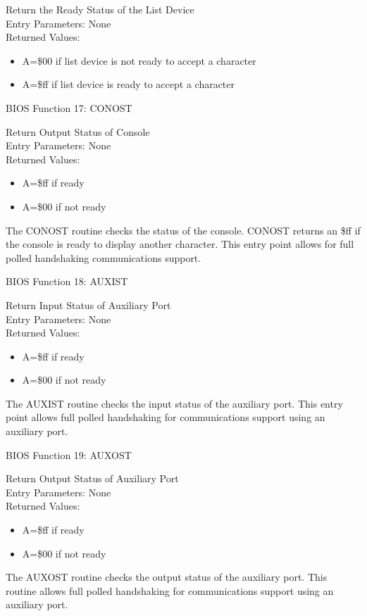 Return the Ready Status of the List Device\\
Entry Parameters: None\\
Returned Values:
\begin{itemize}
\item[] A=\$00 if list device is not ready to accept a character
\item[] A=\$ff if list device is ready to accept a character
\end{itemize}

BIOS Function 17: CONOST

Return Output Status of Console\\
Entry Parameters: None\\
Returned Values:
\begin{itemize}
\item[] A=\$ff if ready
\item[] A=\$00 if not ready
\end{itemize}

The CONOST routine checks the status of the console. CONOST returns an
\$ff if the console is ready to display another character. This entry
point allows for full polled handshaking communications support.

BIOS Function 18: AUXIST

Return Input Status of Auxiliary Port\\
Entry Parameters: None\\
Returned Values:
\begin{itemize}
\item[] A=\$ff if ready
\item[] A=\$00 if not ready
\end{itemize}

The AUXIST routine checks the input status of the auxiliary port. This
entry point allows full polled handshaking for communications support
using an auxiliary port.

BIOS Function 19: AUXOST

Return Output Status of Auxiliary Port\\
Entry Parameters: None\\
Returned Values:
\begin{itemize}
\item[] A=\$ff if ready
\item[] A=\$00 if not ready
\end{itemize}

The AUXOST routine checks the output status of the auxiliary
port. This routine allows full polled handshaking for communications
support using an auxiliary port.

